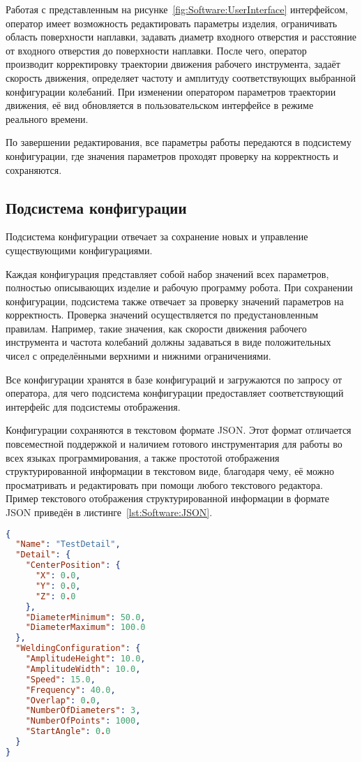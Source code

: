 Работая с представленным на рисунке~\ref{fig:Software:UserInterface} интерфейсом, оператор имеет возможность редактировать параметры изделия, ограничивать область поверхности наплавки, задавать диаметр входного отверстия и расстояние от входного отверстия до поверхности наплавки.
После чего, оператор производит корректировку траектории движения рабочего инструмента, задаёт скорость движения, определяет частоту и амплитуду соответствующих выбранной конфигурации колебаний.
При изменении оператором параметров траектории движения, её вид обновляется в пользовательском интерфейсе в режиме реального времени.

По завершении редактирования, все параметры работы передаются в подсистему конфигурации, где значения параметров проходят проверку на корректность и сохраняются.

\subsection{Подсистема конфигурации}
Подсистема конфигурации отвечает за сохранение новых и управление существующими конфигурациями.

Каждая конфигурация представляет собой набор значений всех параметров, полностью описывающих изделие и рабочую программу робота.
При сохранении конфигурации, подсистема также отвечает за проверку значений параметров на корректность.
Проверка значений осуществляется по предустановленным правилам.
Например, такие значения, как скорости движения рабочего инструмента и частота колебаний должны задаваться в виде положительных чисел с определёнными верхними и нижними ограничениями.

Все конфигурации хранятся в базе конфигураций и загружаются по запросу от оператора, для чего подсистема конфигурации предоставляет соответствующий интерфейс для подсистемы отображения.

Конфигурации сохраняются в текстовом формате JSON.
Этот формат отличается повсеместной поддержкой и наличием готового инструментария для работы во всех языках программирования, а также простотой отображения структурированной информации в текстовом виде, благодаря чему, её можно просматривать и редактировать при помощи любого текстового редактора.
Пример текстового отображения структурированной информации в формате JSON приведён в листинге~\ref{lst:Software:JSON}. \newpage

\begin{lstlisting}[language={json}, caption={Текстовое отображение информации в формате JSON}, label={lst:Software:JSON}]
{
  "Name": "TestDetail",
  "Detail": {
    "CenterPosition": {
      "X": 0.0,
      "Y": 0.0,
      "Z": 0.0
    },
    "DiameterMinimum": 50.0,
    "DiameterMaximum": 100.0
  },
  "WeldingConfiguration": {
    "AmplitudeHeight": 10.0,
    "AmplitudeWidth": 10.0,
    "Speed": 15.0,
    "Frequency": 40.0,
    "Overlap": 0.0,
    "NumberOfDiameters": 3,
    "NumberOfPoints": 1000,
    "StartAngle": 0.0
  }
}
\end{lstlisting}

